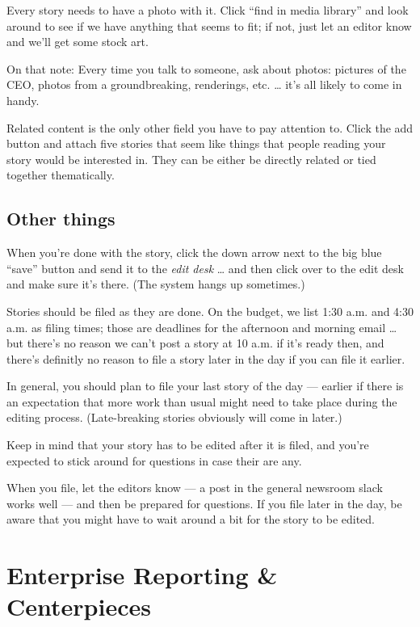 \documentclass[
  11pt,
  american,
  letterpaperpaper,
  extrafontsizes,onecolumn,openright
  ]{memoir}
\begin{document}
Every story needs to have a photo with it. Click \enquote{find in media library} and look around to see if we have anything that seems to fit; if not, just let an editor know and we'll get some stock art.

On that note: Every time you talk to someone, ask about photos: pictures of the CEO, photos from a groundbreaking, renderings, etc. \ldots{} it's all likely to come in handy.

Related content is the only other field you have to pay attention to. Click the add button and attach five stories that seem like things that people reading your story would be interested in. They can be either be directly related or tied together thematically.

\hypertarget{other-things}{%
\section*{Other things}\label{other-things}}

When you're done with the story, click the down arrow next to the big blue \enquote{save} button and send it to the \emph{edit desk} \ldots{} and then click over to the edit desk and make sure it's there. (The system hangs up sometimes.)

Stories should be filed as they are done. On the budget, we list 1:30 a.m. and 4:30 a.m. as filing times; those are deadlines for the afternoon and morning email \ldots{} but there's no reason we can't post a story at 10 a.m. if it's ready then, and there's definitly no reason to file a story later in the day if you can file it earlier.

In general, you should plan to file your last story of the day --- earlier if there is an expectation that more work than usual might need to take place during the editing process. (Late-breaking stories obviously will come in later.)

Keep in mind that your story has to be edited after it is filed, and you're expected to stick around for questions in case their are any.

When you file, let the editors know --- a post in the general newsroom slack works well --- and then be prepared for questions. If you file later in the day, be aware that you might have to wait around a bit for the story to be edited.

\hypertarget{enterprise-reporting-centerpieces}{%
\chapter{Enterprise Reporting \& Centerpieces}\label{enterprise-reporting-centerpieces}}
\end{document}
